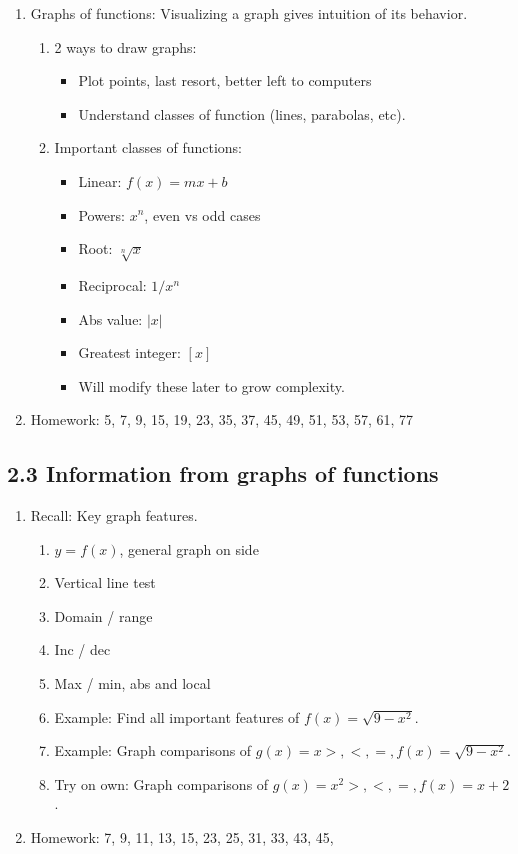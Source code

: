 \documentclass{article}
\begin{document}
\begin{enumerate}
\item Graphs of functions: Visualizing a graph gives intuition of its behavior.
\begin{enumerate}
\item 2 ways to draw graphs:
\begin{itemize}
\item Plot points, last resort, better left to computers
\item Understand classes of function (lines, parabolas, etc).
\end{itemize}
\item Important classes of functions:
\begin{itemize}
\item Linear: $f(x)=mx+b$
\item Powers: $x^n$, even vs odd cases
\item Root: $\sqrt[n]{x}$
\item Reciprocal: $1/x^n$
\item Abs value: $|x|$
\item Greatest integer: $[ x ]$
\item Will modify these later to grow complexity.
\end{itemize}
\end{enumerate}

\item Homework: 5, 7, 9, 15, 19, 23, 35, 37, 45, 49, 51, 53, 57, 61, 77

\end{enumerate}


\subsection{2.3 Information from graphs of functions}

\begin{enumerate}

\item Recall: Key graph features.
\begin{enumerate}
\item $y=f(x)$, general graph on side
\item Vertical line test
\item Domain / range
\item Inc / dec
\item Max / min, abs and local
\item Example: Find all important features of $f(x) = \sqrt{9-x^2}$.
\item Example: Graph comparisons of $g(x)=x > , <, =, f(x)=\sqrt{9-x^2}$.
\item Try on own: Graph comparisons of $g(x)=x^2 > , <, =, f(x)=x+2$.
\end{enumerate} 

\item Homework: 7, 9, 11, 13, 15, 23, 25, 31, 33, 43, 45, 





\end{enumerate}
\end{document}
